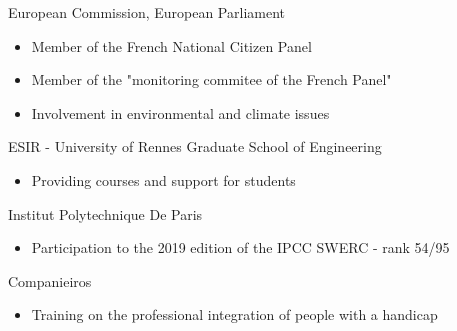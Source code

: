 {European Commission, European Parliament}{}
{\begin{itemize}
    \item Member of the French National Citizen Panel
    \item Member of the "monitoring commitee of the French Panel"
    \item Involvement in environmental and climate issues
\end{itemize}}
{ESIR - University of Rennes Graduate School of Engineering }{}
{\begin{itemize}
    \item Providing courses and support for students
\end{itemize}}
{Institut Polytechnique De Paris }{}
{\begin{itemize}
    \item Participation to the 2019 edition of the IPCC SWERC - rank 54/95 
\end{itemize}}
{Companieiros}{}
{\begin{itemize}
    \item Training on the professional integration of people with a handicap
\end{itemize}}